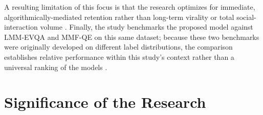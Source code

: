 A resulting limitation of this focus is that the research optimizes for immediate, algorithmically-mediated retention rather than long-term virality or total social-interaction volume \cite{li2024delving}. Finally, the study benchmarks the proposed model against LMM-EVQA \cite{sun2025engagement} and MMF-QE \cite{guan2025mmf} on this same dataset; because these two benchmarks were originally developed on different label distributions, the comparison establishes relative performance within this study's context rather than a universal ranking of the models  \cite{li2025vquala}. 


\section{Significance of the Research}







